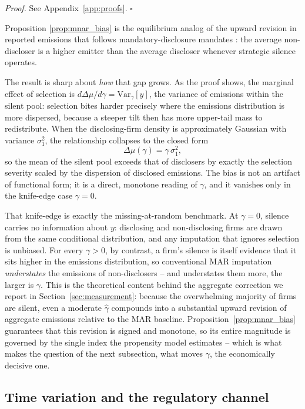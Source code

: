 \documentclass[a4paper,12pt]{article}
\newcommand{\citep}[1]{\parencite{#1}}
\begin{document}
\textit{Proof.} See Appendix~\ref{app:proofs}. \hfill $\square$

Proposition \ref{prop:mnar_bias} is the equilibrium analog of the upward revision in reported emissions that follows mandatory-disclosure mandates \citep{christensen2021mandatory}: the average non-discloser is a higher emitter than the average discloser whenever strategic silence operates.

The result is sharp about \emph{how} that gap grows. As the proof shows, the marginal effect of selection is $d\Delta\mu/d\gamma = \mathrm{Var}_\gamma[y]$, the variance of emissions within the silent pool: selection bites harder precisely where the emissions distribution is more dispersed, because a steeper tilt then has more upper-tail mass to redistribute. When the disclosing-firm density is approximately Gaussian with variance $\sigma_1^2$, the relationship collapses to the closed form
\begin{equation}
\label{eq:gaussian_bias}
    \Delta\mu(\gamma) = \gamma\,\sigma_1^2,
\end{equation}
so the mean of the silent pool exceeds that of disclosers by exactly the selection severity scaled by the dispersion of disclosed emissions. The bias is not an artifact of functional form; it is a direct, monotone reading of $\gamma$, and it vanishes only in the knife-edge case $\gamma = 0$.

That knife-edge is exactly the missing-at-random benchmark. At $\gamma = 0$, silence carries no information about $y$: disclosing and non-disclosing firms are drawn from the same conditional distribution, and any imputation that ignores selection is unbiased. For every $\gamma > 0$, by contrast, a firm's silence is itself evidence that it sits higher in the emissions distribution, so conventional MAR imputation \emph{understates} the emissions of non-disclosers -- and understates them more, the larger is $\gamma$. This is the theoretical content behind the aggregate correction we report in Section~\ref{sec:measurement}: because the overwhelming majority of firms are silent, even a moderate $\hat\gamma$ compounds into a substantial upward revision of aggregate emissions relative to the MAR baseline. Proposition~\ref{prop:mnar_bias} guarantees that this revision is signed and monotone, so its entire magnitude is governed by the single index the propensity model estimates -- which is what makes the question of the next subsection, what moves $\gamma$, the economically decisive one.

\subsection{Time variation and the regulatory channel}
\label{subsec:timevariation}
\end{document}

